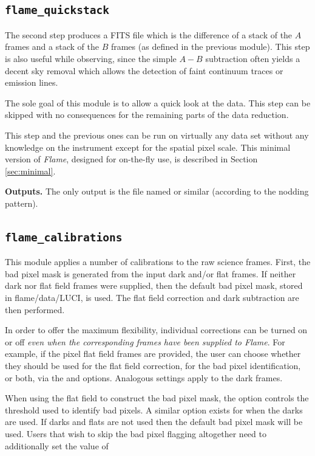 \documentclass[a4paper]{article}
\newcommand{\flame}{\emph{Flame}}
\begin{document}
\begin{sloppypar}
\subsection{\texttt{flame\_quickstack}}

The second step produces a FITS file which is the difference of a stack of the $A$ frames and a stack of the $B$ frames (as defined in the previous module). This step is also useful while observing, since the simple $A-B$ subtraction often yields a decent sky removal which allows the detection of faint continuum traces or emission lines.

The sole goal of this module is to allow a quick look at the data. This step can be skipped with no consequences for the remaining parts of the data reduction.

This step and the previous ones can be run on virtually any data set without any knowledge on the instrument except for the spatial pixel scale. This minimal version of \flame, designed for on-the-fly use, is described in Section \ref{sec:minimal}.

\medskip
\noindent
\textbf{Outputs.} The only output is the file named  or similar (according to the nodding pattern).


\subsection{\texttt{flame\_calibrations}}

This module applies a number of calibrations to the raw science frames. First, the bad pixel mask is generated from the input dark and/or flat frames. If neither dark nor flat field frames were supplied, then the default bad pixel mask, stored in flame/data/LUCI, is used. The flat field correction and dark subtraction are then performed.

In order to offer the maximum flexibility, individual corrections can be turned on or off \emph{even when the corresponding frames have been supplied to \flame}. For example, if the pixel flat field frames are provided, the user can choose whether they should be used for the flat field correction, for the bad pixel identification, or both, via the  and  options. Analogous settings apply to the dark frames.

When using the flat field to construct the bad pixel mask, the option  controls the threshold used to identify bad pixels. A similar option exists for when the darks are used. If darks and flats are not used then the default bad pixel mask will be used. Users that wish to skip the bad pixel flagging altogether need to additionally set the value of 


\end{sloppypar}
\end{document}
